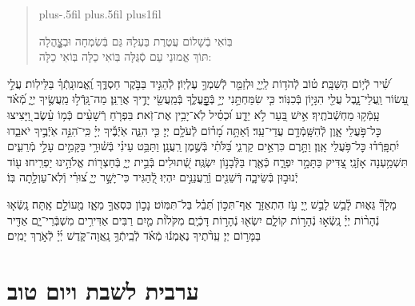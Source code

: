 \documentclass[twoside, openany, parskip=half, 11pt]{book}
\begin{document}
\begin{quote}
\leftskip=0pt plus-.5fil
\rightskip=0pt plus.5fil
\parfillskip=0pt plus1fil

בּֽוֹאִי בְֿשָׁלוֹם עֲטֶרֶת בַּעְלָהּ \hfill
גַּם בְּֿשִׂמְחָה וּבְצׇׇׇׇָהֳלָה \\
תּוֹךְ אֱמוּנֵי עַם סְֿגֻּלָּה \hfill
בּֽוֹאִי כַלָּה בּֽוֹאִי כַלָּה:

\lechadodi

\end{quote}


שִׁ֝֗יר לְֿי֥וֹם הַשַּׁבָּֽת׃
ט֗וֹב לְֿהֹד֥וֹת לַֽיְיָ֑ וּלְזַמֵּ֖ר לְֿשִׁמְךָ֣ עֶלְיֽוֹן׃
לְֿהַגִּ֣יד בַּבֹּ֣קֶר חַסְדֶּ֑ךָ וֶֽ֝אֱמוּנָֽתְֿךָ֗ בַּלֵּילֽוֹת׃
עֲלֵ֣י עָ֭שׂוֹר וַֽעֲלֵי־נָ֑בֶל עֲלֵ֖י הִגָּי֣וֹן בְּֿכִנּֽוֹר׃
כִּ֤י שִׂמַּחְתַּ֣נִי יְיָ֣ בְּֿפׇׇׇׇׇׇׇָֽעֳלֶ֑ךָ בְּֿמַֽעֲשֵׂ֖י יָדֶ֣יךָ אֲרַנֵּֽן׃
מַה־גָּֽדְֿל֣וּ מַֽעֲשֶׂ֣יךָ יְיָ֑ מְֿ֝אֹ֗ד עָֽמְֿק֥וּ מַחְשְֿׁבֹתֶֽיךָ׃
אִ֣ישׁ בַּ֭עַר לֹ֣א יֵדָ֑ע וּ֝כְסִ֗יל לֹֽא־יָבִ֥ין אֶת־זֹֽאת׃
בִּפְרֹ֤חַ רְֿשָׁעִ֨ים כְּֿמ֥וֹ עֵ֗שֶׂב וַ֭יָּצִיצוּ כׇּל־פֹּ֣עֲלֵי אָ֑וֶן לְֿהִשָּֽׁמְֿדָ֥ם עֲדֵי־עַֽד׃
וְֿאַתָּ֥ה מָ֝ר֗וֹם לְֿעֹלָ֥ם יְיָ׃
כִּ֤י הִנֵּ֢ה אֹֽיְֿבֶ֡יךָ יְיָ֗ כִּֽי־ֹהִנֵּ֣ה אֹֽיְֿבֶ֣יךָ יֹאבֵ֑דוּ יִ֝תְפָּֽרְֿד֗וּ כׇּל־פֹּ֥עֲלֵי אָֽוֶן׃
וַתָּ֣רֶם כִּרְאֵ֣ים קַרְנִ֑י בַּ֝לֹּתִ֗י בְּֿשֶׁ֣מֶן רַֽעֲנָֽן׃
וַתַּבֵּ֥ט עֵינִ֗י בְּֿשׁ֫וּרָ֥י בַּקָּמִ֣ים עָלַ֣י מְֿרֵעִ֑ים תִּשְׁמַ֥עְנָה אָזְֿנָֽי׃
 צַ֭דִּיק כַּתָּמָ֣ר יִפְרָ֑ח כְּֿאֶ֖רֶז בַּלְּֿבָנ֣וֹן יִשְׂגֶּֽה׃
שְֿׁ֭תוּלִים בְּֿבֵ֣ית יְיָ֑ בְּֿחַצְר֖וֹת אֱלֹהֵ֣ינוּ יַפְרִֽיחוּ׃
ע֖וֹד יְֿנוּב֣וּן בְּֿשֵׂיבָ֑ה דְּֿשֵׁנִ֖ים וְֿרַֽעֲנַנִּ֣ים יִהְיֽוּ׃
לְֿ֭הַגִּיד כִּי־יָשָׁ֣ר יְיָ֑ צ֝וּרִ֗י וְֿלֹֽא־עַוְלָ֥תָה בּֽוֹ׃

\clearpage
{}
מָלָךְ֘ גֵּא֢וּת לָ֫בֵ֥שׁ לָבֵ֣שׁ יְ֖יָ עֹ֣ז הִתְאַזָּר֑ אַף־תִּכּ֣וֹן תֵּ֝בֵ֗ל בַּל־תִּמּֽוֹט׃
נָכ֣וֹן כִּסְאֲךָ֣ מֵאָ֑ז מֵ֖עוֹלָ֣ם אָֽתָּה׃
נָֽשְֿׂא֤וּ נְֿהָר֨וֹת יְיָ֗ נָֽשְֿׂא֣וּ נְֿהָר֣וֹת קוֹלָ֑ם יִשְׂא֖וּ נְֿהָר֣וֹת דָּכְֿיָֽם׃
 מִקֹּלוֹ֨ת מַ֤יִם רַבִּים אַדִּירִ֥ים מִשְׁבְּֿרֵי־יָ֑ם אַדִּ֖יר בַּמָּר֣וֹם יְיָ׃
עֵֽדֹ֨תֶיךָ נֶאֶמְנ֬וּ מְֿאֹ֗ד לְֿבֵֽיתְֿךָ֥ נָֽאֲוָה־קֹּ֑דֶשׁ יְ֜יָ֗ לְֿאֹ֣רֶךְ יָמִֽים׃

\mournerskaddish

\vspace{\baselineskip}

{\let\clearpage\relax
\chapter[ערבית לשבת ויום טוב]{ ערבית לשבת ויום טוב }}

\barachu
\end{document}
